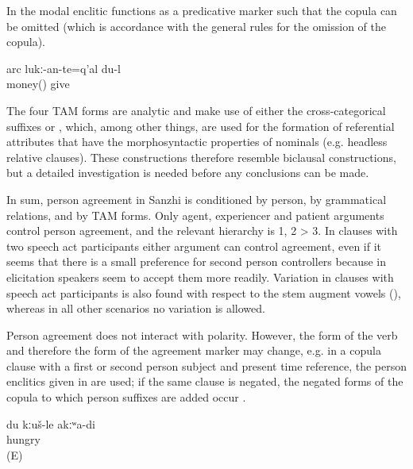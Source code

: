 In  the modal enclitic  functions as a predicative marker such that the copula can be omitted (which is accordance with the general rules for the omission of the copula).
 
 
\begin{exe}

	\ex	\label{ex:‎‎‎I have to give the money back}
	\gll	arc	lukː-an-te=q'al	du-l\\
		money()	give	\\
	\glt	{}
\end{exe}


The four TAM forms are analytic and make use of either the cross-categorical suffixes  or , which, among other things, are used for the formation of referential attributes that have the morphosyntactic properties of nominals (e.g. headless relative clauses). These constructions therefore resemble biclausal constructions, but a detailed investigation is needed before any conclusions can be made.



In sum, person agreement in Sanzhi is conditioned by person, by grammatical relations, and by TAM forms. Only agent, experiencer and patient arguments control person agreement, and the relevant hierarchy is 1, 2 > 3. In clauses with two speech act participants either argument can control agreement, even if it seems that there is a small preference for second person controllers because in elicitation speakers seem to accept them more readily. Variation in clauses with speech act participants is also found with respect to the stem augment vowels (), whereas in all other scenarios no variation is allowed.


Person agreement does not interact with polarity. However, the form of the verb and therefore the form of the agreement marker may change, e.g. in a copula clause with a first or second person subject and present time reference, the person enclitics given in  are used; if the same clause is negated, the negated forms of the copula to which person suffixes are added occur . 
%
\begin{exe}
	\ex	\label{ex:I am not hungry@24}
	\gll	du	kːuš-le	akːʷa-di\\
			hungry	\\
	\glt	{} (E)
\end{exe}

